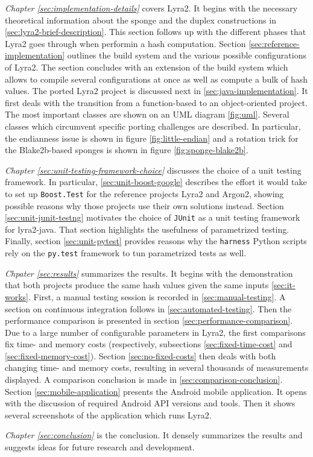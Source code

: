 \emph{Chapter \ref{sec:implementation-details}} covers Lyra2. It begins with the necessary theoretical information about the sponge and the duplex constructions in \ref{sec:lyra2-brief-description}. This section follows up with the different phases that Lyra2 goes through when performin a hash computation. Section \ref{sec:reference-implementation} outlines the build system and the various possible configurations of Lyra2. The section concludes with an extension of the build system which allows to compile several configurations at once as well as compute a bulk of hash values. The ported Lyra2 project is discussed next in \ref{sec:java-implementation}. It first deals with the transition from a function-based to an object-oriented project. The most important classes are shown on an UML diagram \ref{fig:uml}. Several classes which circumvent specific porting challenges are described. In particular, the endianness issue is shown in figure \ref{fig:little-endian} and a rotation trick for the Blake2b-based sponges is shown in figure \ref{fig:sponge-blake2b}.

\emph{Chapter \ref{sec:unit-testing-framework-choice}} discusses the choice of a unit testing framework. In particular, \ref{sec:unit-boost-google} describes the effort it would take to set up \texttt{Boost.Test} for the reference projects Lyra2 and Argon2, showing possible reasons why those projects use their own solutions instead. Section \ref{sec:unit-junit-testng} motivates the choice of \texttt{JUnit} as a unit testing framework for lyra2-java. That section highlights the usefulness of parametrized testing. Finally, section \ref{sec:unit-pytest} provides reasons why the \texttt{harness} Python scripts rely on the \texttt{py.test} framework to tun parametrized tests as well.

\emph{Chpater \ref{sec:results}} summarizes the results. It begins with the demonstration that both projects produce the same hash values given the same inputs \ref{sec:it-works}. First, a manual testing session is recorded in \ref{sec:manual-testing}. A section on continuous integration follows in \ref{sec:automated-testing}. Then the performance comparison is presented in section \ref{sec:performance-comparison}. Due to a large number of configurable parameters in Lyra2, the first comparisons fix time- and memory costs (respectively, subsections \ref{sec:fixed-time-cost} and \ref{sec:fixed-memory-cost}). Section \ref{sec:no-fixed-costs} then deals with both changing time- and memory costs, resulting in several thousands of measurements displayed. A comparison conclusion is made in \ref{sec:comparison-conclusion}. Section \ref{sec:mobile-application} presents the Android mobile application. It opens with the discussion of required Android API versions and tools. Then it shows several screenshots of the application which runs Lyra2.

\emph{Chapter \ref{sec:conclusion}} is the conclusion. It densely summarizes the results and suggests ideas for future research and development.
